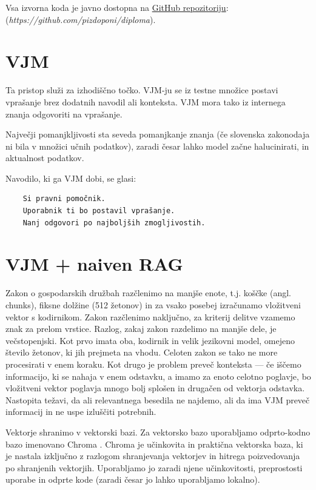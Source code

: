 \documentclass[a4paper,12pt,openright]{book}
\begin{document}
Vsa izvorna koda je javno dostopna na \href{https://github.com/pizdoponi/diploma}{GitHub repozitoriju}: \\(\textit{https://github.com/pizdoponi/diploma}). 

\section{VJM}

Ta pristop služi za izhodiščno točko. VJM-ju se iz testne množice postavi vprašanje brez dodatnih navodil ali konteksta. VJM mora tako iz internega znanja odgovoriti na vprašanje.

Največji pomanjkljivosti sta seveda pomanjkanje znanja (če slovenska zakonodaja ni bila v množici učnih podatkov), zaradi česar lahko model začne halucinirati, in aktualnost podatkov.

Navodilo, ki ga VJM dobi, se glasi:

\begin{verbatim}
    Si pravni pomočnik.
    Uporabnik ti bo postavil vprašanje.
    Nanj odgovori po najboljših zmogljivostih.
\end{verbatim}

\section{VJM + naiven RAG}

Zakon o gospodarskih družbah razčlenimo na manjše enote, t.j. koščke (angl. chunks), fiksne dolžine (512 žetonov) in za vsako posebej izračunamo vložitveni vektor s kodirnikom. Zakon razčlenimo naključno, za kriterij delitve vzamemo znak za prelom vrstice. Razlog, zakaj zakon razdelimo na manjše dele, je večstopenjski. Kot prvo imata oba, kodirnik in velik jezikovni model, omejeno število žetonov, ki jih prejmeta na vhodu. Celoten zakon se tako ne more procesirati v enem koraku. Kot drugo je problem preveč konteksta — če iščemo informacijo, ki se nahaja v enem odstavku, a imamo za enoto celotno poglavje, bo vložitveni vektor poglavja mnogo bolj splošen in drugačen od vektorja odstavka. Nastopita težavi, da ali relevantnega besedila ne najdemo, ali da ima VJM preveč informacij in ne uspe izluščiti potrebnih.

Vektorje shranimo v vektorski bazi. Za vektorsko bazo uporabljamo odprto-kodno bazo imenovano Chroma \cite{chroma}. Chroma je učinkovita in praktična vektorska baza, ki je nastala izključno z razlogom shranjevanja vektorjev in hitrega poizvedovanja po shranjenih vektorjih. Uporabljamo jo zaradi njene učinkovitosti, preprostosti uporabe in odprte kode (zaradi česar jo lahko uporabljamo lokalno).
\end{document}

